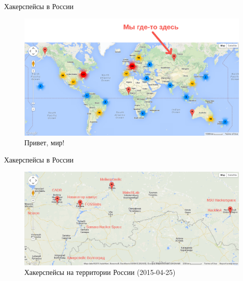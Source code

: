 \documentclass[presentation]{beamer}
\begin{document}
\begin{frame}[label=sec-1-3-4]{Хакерспейсы в России}
  \begin{figure}[htb]
    \centering
    \includegraphics[width=1\linewidth]{active-hackerspaces-2015-04-25-w-arrow}
    \caption{Привет, мир!}
  \end{figure}
\end{frame}

\begin{frame}[label=sec-1-3-5]{Хакерспейсы в России}
  \begin{figure}[htb]
    \centering
    \includegraphics[width=1\linewidth]{active-hackerspaces-russia-2015-04-25}
    \caption{\label{active-hackerspaces-russia}Хакерспейсы на
      территории России (2015-04-25)}
  \end{figure}
\end{frame}
\end{document}
